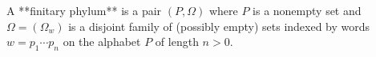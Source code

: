 A **finitary phylum** is a pair $(P, \Omega)$ where $P$ is a nonempty set and $\Omega = (\Omega_w)$ is a disjoint family of (possibly empty) sets indexed by words $w = p_1 \cdots p_n$ on the alphabet $P$ of length $n > 0$.

\cite{BirkhoffLipson70}
\cite{Gratzer69}
\cite{Higgins63}
